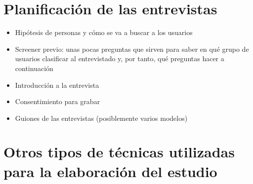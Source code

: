 \section{Planificación de las entrevistas}

\begin{itemize}
    \item Hipótesis de personas y cómo se va a buscar a los usuarios
    \item Screener previo: unas pocas preguntas que sirven para saber en qué grupo de usuarios clasificar al entrevistado y, por tanto, qué preguntas hacer a continuación
    \item Introducción a la entrevista
    \item Consentimiento para grabar
    \item Guiones de las entrevistas (posiblemente varios modelos)
\end{itemize}

\section{Otros tipos de técnicas utilizadas para la elaboración del estudio}